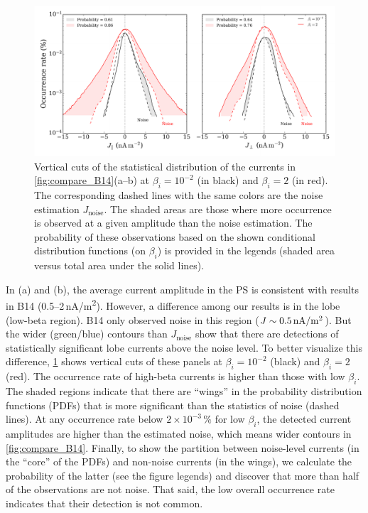 \documentclass[draft]{agujournal2019}
\begin{document}
\begin{figure}
\centering
\noindent\includegraphics[width=\textwidth]{2023JA031358R-f04.pdf}
\caption{
    Vertical cuts of the statistical distribution of the currents in \cref{fig:compare_B14}(a--b) at ${\beta_i=10^{-2}}$ (in black) and ${\beta_i=2}$ (in red). The corresponding dashed lines with the same colors are the noise estimation $J_\text{noise}$. The shaded areas are those where more occurrence is observed at a given amplitude than the noise estimation. The probability of these observations based on the shown conditional distribution functions (on $\beta_i$) is provided in the legends (shaded area versus total area under the solid lines).
}
\label{fig:J_slices}
\end{figure}

In (a) and (b), the average current amplitude in the PS is consistent with results in B14 (\mbox{0.5--2\,\si{nA/m\tothe{2}}}). However, a difference among our results is in the lobe (low-beta region). B14 only observed noise in this region (\mbox{$J\sim0.5\,\si{nA/m\tothe{2}}$}). But the wider (green/blue) contours than \mbox{${J_\text{noise}}$} show that there are detections of statistically significant lobe currents above the noise level. To better visualize this difference, \mbox{\cref{fig:J_slices}} shows vertical cuts of these panels at \mbox{$\beta_i=10^{-2}$} (black) and \mbox{$\beta_i=2$} (red). The occurrence rate of high-beta currents is higher than those with low \mbox{$\beta_i$}. The shaded regions indicate that there are ``wings'' in the probability distribution functions (PDFs) that is more significant than the statistics of noise (dashed lines). At any occurrence rate below \mbox{$2\times10^{-3}\,\%$} for low $\beta_i$, the detected current amplitudes are higher than the estimated noise, which means wider contours in \mbox{\cref{fig:compare_B14}}. Finally, to show the partition between noise-level currents (in the ``core'' of the PDFs) and non-noise currents (in the wings), we calculate the probability of the latter (see the figure legends) and discover that more than half of the observations are not noise. That said, the low overall occurrence rate indicates that their detection is not common.
\end{document}
